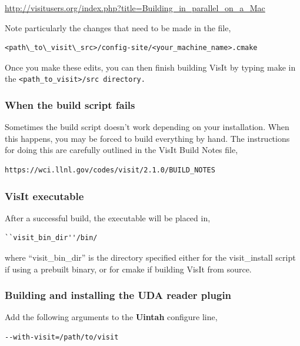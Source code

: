 \documentclass[12pt]{article}
\begin{document}
\url{http://visitusers.org/index.php?title=Building_in_parallel_on_a_Mac}

  
Note particularly the changes that need to be made in the file, 

\begin{verbatim}
<path\_to\_visit\_src>/config-site/<your_machine_name>.cmake
\end{verbatim}

\normalfont Once you make these edits, you can then finish building VisIt by typing make in the \tt <path\_to\_visit>/src \normalfont directory.  

\subsubsection{When the build script fails}
\label{sec:WhenTheBuildsSriptFails}

Sometimes the build script doesn't work depending on your
installation. When this happens, you may be forced to build everything
by hand. The instructions for doing this are carefully outlined in the
VisIt Build Notes file,

\begin{verbatim}
https://wci.llnl.gov/codes/visit/2.1.0/BUILD_NOTES
\end{verbatim}

\subsubsection{VisIt executable}
\label{sec:VisItExecutable}

After a successful build, the executable will be placed in,

\begin{verbatim}
``visit_bin_dir''/bin/
\end{verbatim}

where ``visit\_bin\_dir'' is the directory specified either for the
visit\_install script if using a prebuilt binary, or for cmake if
building VisIt from source.

\subsubsection{Building and installing the UDA reader plugin}
\label{sec:BuildingAndInstallingUDAPlugin}

Add the following arguments to the \textbf{Uintah} configure line,

\begin{verbatim}
--with-visit=/path/to/visit
\end{verbatim}
\end{document}
